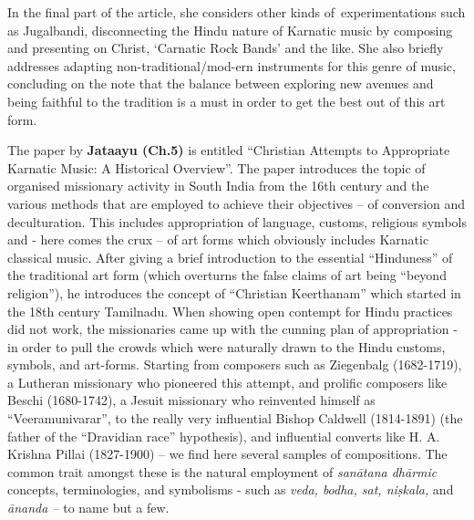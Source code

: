 In the final part of the article, she considers other kinds of~experimentations such as Jugalbandi, disconnecting the Hindu nature of Karnatic music by composing and presenting on Christ, ‘Carnatic Rock Bands’ and the like. She also briefly addresses adapting non-traditional/mod-ern instruments for this genre of music, concluding on the note that the balance between exploring new avenues and being faithful to the tradition is a must in order to get the best out of this art form.

The paper by \textbf{Jataayu (Ch.5)} is entitled “Christian Attempts to Appropriate Karnatic Music: A Historical Overview”. The paper introduces the topic of organised missionary activity in South India from the 16th century and the various methods that are employed to achieve their objectives – of conversion and deculturation. This includes appropriation of language, customs, religious symbols and - here comes the crux – of art forms which obviously includes Karnatic classical music. After giving a brief introduction to the essential “Hinduness” of the traditional art form (which overturns the false claims of art being “beyond religion”), he introduces the concept of “Christian Keerthanam” which started in the 18th century Tamilnadu. When showing open contempt for Hindu practices did not work, the missionaries came up with the cunning plan of appropriation - in order to pull the crowds which were naturally drawn to the Hindu customs, symbols, and art-forms. Starting from composers such as Ziegenbalg (1682-1719), a Lutheran missionary who pioneered this attempt, and prolific composers like Beschi (1680-1742), a Jesuit missionary who reinvented himself as “Veeramunivarar”, to the really very influential Bishop Caldwell (1814-1891) (the father of the “Dravidian race” hypothesis), and influential converts like H. A. Krishna Pillai (1827-1900) – we find here several samples of compositions. The common trait amongst these is the natural employment of \textit{sanātana dhārmic} concepts, terminologies, and symbolisms - such as \textit{veda, bodha, sat, niṣkala,} and \textit{ānanda –} to name but a few.

